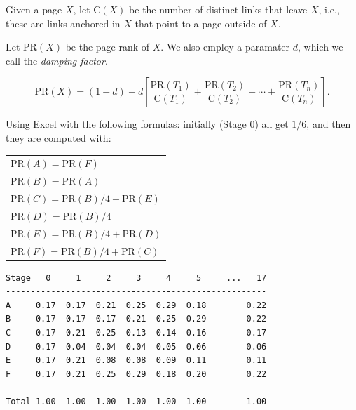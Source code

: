 \begin{frame}
Given a page
$X$, let $\text{C}(X)$ be the number of distinct links that leave $X$, i.e.,
these are links anchored in $X$ that point to a page outside of $X$.

Let $\text{PR}(X)$ be the page rank of $X$. We also employ a paramater
$d$, which we call the {\em damping factor}.

$$
\text{PR}(X)=(1-d)+d\left[
\frac{\text{PR}(T_1)}{\text{C}(T_1)}+
\frac{\text{PR}(T_2)}{\text{C}(T_2)}+\cdots+
\frac{\text{PR}(T_n)}{\text{C}(T_n)}\right].
$$
\end{frame}

\begin{frame}
\begin{center}
\begin{minipage}{6cm}
\end{minipage}
\end{center}
\end{frame}

\begin{frame}
Using Excel with the following formulas: initially (Stage 0) all get
$1/6$, and then they are computed with:
\begin{tabular}{l}
$\text{PR}(A)=\text{PR}(F)$ \\
$\text{PR}(B)=\text{PR}(A)$ \\
$\text{PR}(C)=\text{PR}(B)/4+\text{PR}(E)$ \\
$\text{PR}(D)=\text{PR}(B)/4$ \\
$\text{PR}(E)=\text{PR}(B)/4+\text{PR}(D)$ \\
$\text{PR}(F)=\text{PR}(B)/4+\text{PR}(C)$ \\
\end{tabular}
\end{frame}

\begin{frame}[fragile]
\begin{verbatim}
Stage	0     1     2     3     4     5     ...   17
----------------------------------------------------
A     0.17  0.17  0.21  0.25  0.29  0.18        0.22
B     0.17  0.17  0.17  0.21  0.25  0.29        0.22
C     0.17  0.21  0.25  0.13  0.14  0.16        0.17
D     0.17  0.04  0.04  0.04  0.05  0.06        0.06
E     0.17  0.21  0.08  0.08  0.09  0.11        0.11
F     0.17  0.21  0.25  0.29  0.18  0.20        0.22
----------------------------------------------------
Total 1.00  1.00  1.00  1.00  1.00  1.00        1.00
\end{verbatim}
\end{frame}

